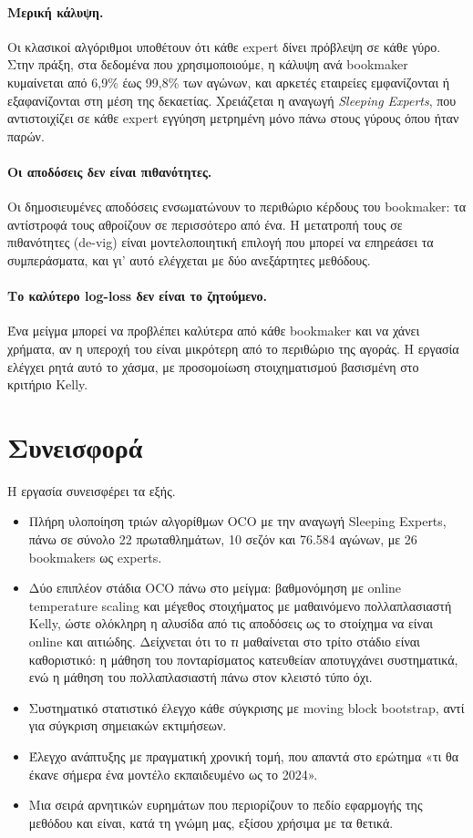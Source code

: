 \documentclass[12pt,a4paper,oneside]{report}
\newcommand{\en}[1]{\textenglish{#1}}
\renewcommand{\_}{\oldunderscore\allowbreak}
\theoremstyle{definition}
\theoremstyle{plain}
\theoremstyle{remark}
\begin{document}
\paragraph{Μερική κάλυψη.} Οι κλασικοί αλγόριθμοι υποθέτουν ότι κάθε expert δίνει πρόβλεψη
σε κάθε γύρο. Στην πράξη, στα δεδομένα που χρησιμοποιούμε, η κάλυψη ανά bookmaker κυμαίνεται
από 6,9\% έως 99,8\% των αγώνων, και αρκετές εταιρείες εμφανίζονται ή εξαφανίζονται στη μέση
της δεκαετίας. Χρειάζεται η αναγωγή \emph{Sleeping Experts}, που αντιστοιχίζει σε κάθε
expert εγγύηση μετρημένη μόνο πάνω στους γύρους όπου ήταν παρών.

\paragraph{Οι αποδόσεις δεν είναι πιθανότητες.} Οι δημοσιευμένες αποδόσεις ενσωματώνουν το
περιθώριο κέρδους του bookmaker: τα αντίστροφά τους αθροίζουν σε περισσότερο από ένα. Η
μετατροπή τους σε πιθανότητες (\en{de-vig}) είναι μοντελοποιητική επιλογή που μπορεί να
επηρεάσει τα συμπεράσματα, και γι' αυτό ελέγχεται με δύο ανεξάρτητες μεθόδους.

\paragraph{Το καλύτερο log-loss δεν είναι το ζητούμενο.} Ένα μείγμα μπορεί να προβλέπει
καλύτερα από κάθε bookmaker και να χάνει χρήματα, αν η υπεροχή του είναι μικρότερη από το
περιθώριο της αγοράς. Η εργασία ελέγχει ρητά αυτό το χάσμα, με προσομοίωση στοιχηματισμού
βασισμένη στο κριτήριο Kelly.

\section{Συνεισφορά}

Η εργασία συνεισφέρει τα εξής.

\begin{itemize}
  \item Πλήρη υλοποίηση τριών αλγορίθμων OCO με την αναγωγή Sleeping Experts, πάνω σε
        σύνολο 22 πρωταθλημάτων, 10 σεζόν και 76.584 αγώνων, με 26 bookmakers ως experts.
  \item Δύο επιπλέον στάδια OCO πάνω στο μείγμα: βαθμονόμηση με online temperature scaling
        και μέγεθος στοιχήματος με μαθαινόμενο πολλαπλασιαστή Kelly, ώστε ολόκληρη η αλυσίδα
        από τις αποδόσεις ως το στοίχημα να είναι online και αιτιώδης. Δείχνεται ότι το
        \emph{τι} μαθαίνεται στο τρίτο στάδιο είναι καθοριστικό: η μάθηση του πονταρίσματος
        κατευθείαν αποτυγχάνει συστηματικά, ενώ η μάθηση του πολλαπλασιαστή πάνω στον
        κλειστό τύπο όχι.
  \item Συστηματικό στατιστικό έλεγχο κάθε σύγκρισης με moving block bootstrap, αντί για
        σύγκριση σημειακών εκτιμήσεων.
  \item Έλεγχο ανάπτυξης με πραγματική χρονική τομή, που απαντά στο ερώτημα «τι θα έκανε
        σήμερα ένα μοντέλο εκπαιδευμένο ως το 2024».
  \item Μια σειρά αρνητικών ευρημάτων που περιορίζουν το πεδίο εφαρμογής της μεθόδου και
        είναι, κατά τη γνώμη μας, εξίσου χρήσιμα με τα θετικά.
\end{itemize}
\end{document}
